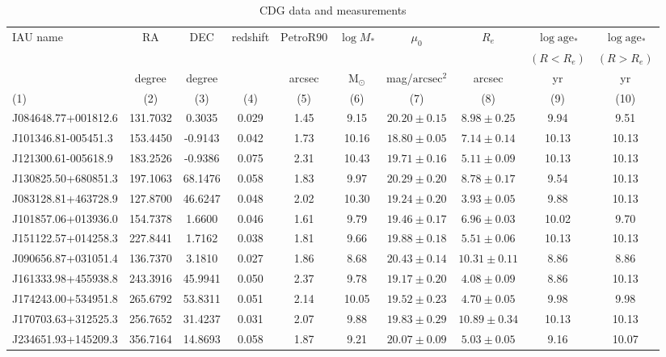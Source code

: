 \documentclass[fleqn,usenatbib]{mnras}
\begin{document}
\begin{table*}
\centering
\caption{CDG data and measurements}
\label{tab:table_data}
\begin{tabular}{lccccccccc} 
\hline
IAU name	&	RA	&	DEC	&	redshift	&	$\mathrm{PetroR90}$	&	$\log M_*$	&	$\mu_0$	&	$R_e$	&	$\log \mathrm{age_*}$	&	$\log \mathrm{age_*}$	\\
& & & & & & & & $(R<R_e)$ & $(R>R_e)$ \\
&	degree	&	degree	&		&	arcsec	&	$\mathrm{M_\odot}$	&		mag/$\mathrm{arcsec^2}$				&		arcsec				&	yr	&	yr	\\
(1) & (2) & (3) & (4) & (5) & (6) & (7) & (8) & (9) & (10) \\
\hline
J084648.77+001812.6	&	131.7032	&	0.3035	&	0.029	&	1.45	&	9.15	&	$	20.20	\pm	0.15	$	&	$	8.98	\pm	0.25	$	&	9.94	&	9.51	\\
J101346.81-005451.3	&	153.4450	&	-0.9143	&	0.042	&	1.73	&	10.16	&	$	18.80	\pm	0.05	$	&	$	7.14	\pm	0.14	$	&	10.13	&	10.13	\\
J121300.61-005618.9	&	183.2526	&	-0.9386	&	0.075	&	2.31	&	10.43	&	$	19.71	\pm	0.16	$	&	$	5.11	\pm	0.09	$	&	10.13	&	10.13	\\
J130825.50+680851.3	&	197.1063	&	68.1476	&	0.058	&	1.83	&	9.97	&	$	20.29	\pm	0.20	$	&	$	8.78	\pm	0.17	$	&	9.54	&	10.13	\\
J083128.81+463728.9	&	127.8700	&	46.6247	&	0.048	&	2.02	&	10.30	&	$	19.24	\pm	0.20	$	&	$	3.93	\pm	0.05	$	&	9.88	&	10.13	\\
J101857.06+013936.0	&	154.7378	&	1.6600	&	0.046	&	1.61	&	9.79	&	$	19.46	\pm	0.17	$	&	$	6.96	\pm	0.03	$	&	10.02	&	9.70	\\
J151122.57+014258.3	&	227.8441	&	1.7162	&	0.038	&	1.81	&	9.66	&	$	19.88	\pm	0.18	$	&	$	5.51	\pm	0.06	$	&	10.13	&	10.13	\\
J090656.87+031051.4	&	136.7370	&	3.1810	&	0.027	&	1.86	&	8.68	&	$	20.43	\pm	0.14	$	&	$	10.31	\pm	0.11	$	&	8.86	&	8.86	\\
J161333.98+455938.8	&	243.3916	&	45.9941	&	0.050	&	2.37	&	9.78	&	$	19.17	\pm	0.20	$	&	$	4.08	\pm	0.09	$	&	8.86	&	10.13	\\
J174243.00+534951.8	&	265.6792	&	53.8311	&	0.051	&	2.14	&	10.05	&	$	19.52	\pm	0.23	$	&	$	4.70	\pm	0.05	$	&	9.98	&	9.98	\\
J170703.63+312525.3	&	256.7652	&	31.4237	&	0.031	&	2.07	&	9.88	&	$	19.83	\pm	0.29	$	&	$	10.89	\pm	0.34	$	&	10.13	&	10.13	\\
J234651.93+145209.3	&	356.7164	&	14.8693	&	0.058	&	1.87	&	9.21	&	$	20.07	\pm	0.09	$	&	$	5.03	\pm	0.05	$	&	9.16	&	10.07	\\

\end{tabular}
\end{table*}
\end{document}
